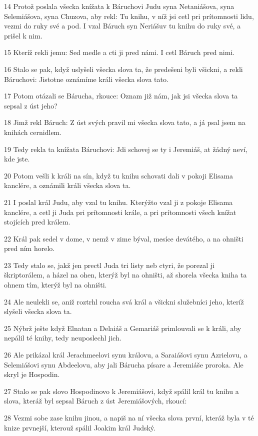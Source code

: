 \par 14 Protož poslala všecka knížata k Báruchovi Judu syna Netaniášova, syna Selemiášova, syna Chuzova, aby rekl: Tu knihu, v níž jsi cetl pri prítomnosti lidu, vezmi do ruky své a pod. I vzal Báruch syn Neriášuv tu knihu do ruky své, a prišel k nim.
\par 15 Kteríž rekli jemu: Sed medle a cti ji pred námi. I cetl Báruch pred nimi.
\par 16 Stalo se pak, když uslyšeli všecka slova ta, že predešeni byli všickni, a rekli Báruchovi: Jistotne oznámíme králi všecka slova tato.
\par 17 Potom otázali se Bárucha, rkouce: Oznam již nám, jak jsi všecka slova ta sepsal z úst jeho?
\par 18 Jimž rekl Báruch: Z úst svých pravil mi všecka slova tato, a já psal jsem na knihách cernidlem.
\par 19 Tedy rekla ta knížata Báruchovi: Jdi schovej se ty i Jeremiáš, at žádný neví, kde jste.
\par 20 Potom vešli k králi na sín, když tu knihu schovati dali v pokoji Elisama kanclére, a oznámili králi všecka slova ta.
\par 21 I poslal král Judu, aby vzal tu knihu. Kterýžto vzal ji z pokoje Elisama kanclére, a cetl ji Juda pri prítomnosti krále, a pri prítomnosti všech knížat stojících pred králem.
\par 22 Král pak sedel v dome, v nemž v zime býval, mesíce devátého, a na ohništi pred ním horelo.
\par 23 Tedy stalo se, jakž jen prectl Juda tri listy neb ctyri, že porezal ji škriptorálem, a házel na ohen, kterýž byl na ohništi, až shorela všecka kniha ta ohnem tím, kterýž byl na ohništi.
\par 24 Ale neulekli se, aniž roztrhl roucha svá král a všickni služebníci jeho, kteríž slyšeli všecka slova ta.
\par 25 Nýbrž ješte když Elnatan a Delaiáš a Gemariáš primlouvali se k králi, aby nepálil té knihy, tedy neuposlechl jich.
\par 26 Ale prikázal král Jerachmeelovi synu královu, a Saraiášovi synu Azrielovu, a Selemiášovi synu Abdeelovu, aby jali Bárucha písare a Jeremiáše proroka. Ale skryl je Hospodin.
\par 27 Stalo se pak slovo Hospodinovo k Jeremiášovi, když spálil král tu knihu a slova, kteráž byl sepsal Báruch z úst Jeremiášových, rkoucí:
\par 28 Vezmi sobe zase knihu jinou, a napiš na ní všecka slova první, kteráž byla v té knize prvnejší, kterouž spálil Joakim král Judský.
